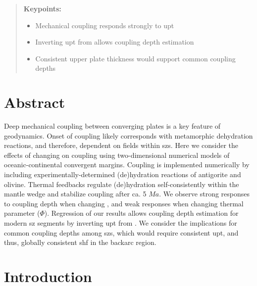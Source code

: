
\begin{quote}
\textbf{Keypoints:}

\begin{itemize}
\item
  Mechanical coupling responds strongly to \gls{upt}
\item
  Inverting \gls{upt} from  allows coupling depth estimation
\item
  Consistent upper plate thickness would support common coupling depths
\end{itemize}
\end{quote}

\hypertarget{abstract}{%
\section{Abstract}\label{abstract}}

Deep mechanical coupling between converging plates is a key feature of  geodynamics. Onset of coupling likely corresponds with metamorphic dehydration reactions, and therefore, dependent on  fields within \glspl{sz}. Here we consider the effects of changing  on coupling using two-dimensional numerical models of oceanic-continental convergent margins. Coupling is implemented numerically by including experimentally-determined (de)hydration reactions of antigorite and olivine. Thermal feedbacks regulate (de)hydration self-consistently within the mantle wedge and stabilize coupling after ca. 5 \(Ma\). We observe strong responses to coupling depth when changing , and weak responses when changing thermal parameter (\(\Phi\)). Regression of our results allows coupling depth estimation for modern \gls{sz} segments by inverting \gls{upt} from . We consider the implications for common coupling depths among \glspl{sz}, which would require consistent \gls{upt}, and thus, globally consistent \gls{shf} in the backarc region.

\hypertarget{introduction-1}{%
\section{Introduction}\label{introduction-1}}

